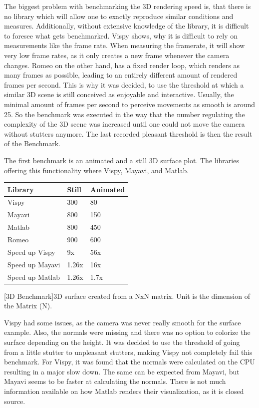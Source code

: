 The biggest problem with benchmarking the 3D rendering speed is, that there is no library which will allow one to exactly reproduce similar conditions and measures. 
Additionally, without extensive knowledge of the library, it is difficult to foresee what gets benchmarked. 
Vispy shows, why it is difficult to rely on measurements like the frame rate. 
When measuring the framerate, it will show very low frame rates, as it only creates a new frame whenever the camera changes.
Romeo on the other hand, has a fixed render loop, which renders as many frames as possible, leading to an entirely different amount of rendered frames per second. 
This is why it was decided, to use the threshold at which a similar 3D scene is still conceived as enjoyable and interactive. Usually, the minimal amount of frames per second to perceive movements as smooth is around 25.
So the benchmark was executed in the way that the number regulating the complexity of the 3D scene was increased until one could not move the camera without stutters anymore. The last recorded pleasant threshold is then the result of the Benchmark.

The first benchmark is an animated and a still 3D surface plot. The libraries offering this functionality where Vispy, Mayavi, and Matlab.

\begin{table}[htbp]
    \centering
    \begin{tabular}{l|l|l}
        \hline
        \textbf{Library} & \textbf{Still} & \textbf{Animated} \\
        \hline
        Vispy            & 300            & 80    \\
        Mayavi           & 800            & 150   \\
        Matlab           & 800            & 450   \\
        Romeo            & 900            & 600   \\
        \hline
        \hline
        Speed up Vispy   & 9x            & 56x   \\
        Speed up Mayavi  & 1.26x         & 16x   \\
        Speed up Matlab  & 1.26x         & 1.7x  \\
    \end{tabular}
    [3D Benchmark]{3D surface created from a NxN matrix. Unit is the dimension of the Matrix (N).}
    \label{table:relativespeedoglw}
\end{table}
Vispy had some issues, as the camera was never really smooth for the surface example. Also, the normals were missing and there was no option to colorize the surface depending on the height.
It was decided to use the threshold of going from a little stutter to unpleasant stutters, making Vispy not completely fail this benchmark.
For Vispy, it was found that the normals were calculated on the CPU resulting in a major slow down\cite{VispyGithub}. The same can be expected from Mayavi, but Mayavi seems to be faster at calculating the normals.
There is not much information available on how Matlab renders their visualization, as it is closed source.

